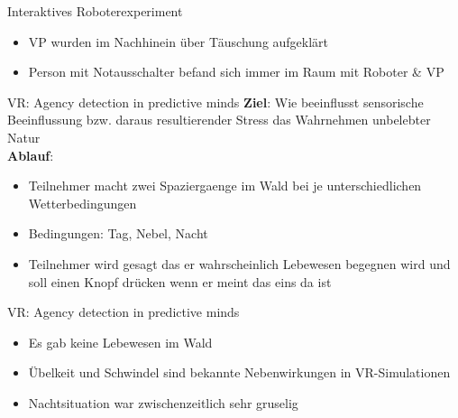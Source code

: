 \documentclass[10pt]{beamer}
\begin{document}
	\begin{frame}{Interaktives Roboterexperiment}

		\begin{itemize}
			\item VP wurden im Nachhinein über Täuschung aufgeklärt
			\item Person mit Notausschalter befand sich immer im Raum mit Roboter \& VP
		\end{itemize}
	\end{frame}
	
	\begin{frame}{VR: Agency detection in predictive minds}
		\textbf{Ziel}: Wie beeinflusst sensorische Beeinflussung bzw. daraus resultierender Stress das Wahrnehmen unbelebter Natur \\
		\textbf{Ablauf}:
		\begin{itemize}
		\item Teilnehmer macht zwei Spaziergaenge im Wald bei je unterschiedlichen Wetterbedingungen
		\item Bedingungen: Tag, Nebel, Nacht
		\item Teilnehmer wird gesagt das er wahrscheinlich Lebewesen begegnen wird und soll einen Knopf drücken wenn er meint das eins da ist
		\end{itemize}
	\end{frame}
	
	
	\begin{frame}{VR: Agency detection in predictive minds}
		
		\begin{itemize}
			\item Es gab keine Lebewesen im Wald
			\item Übelkeit und Schwindel sind bekannte Nebenwirkungen in VR-Simulationen
			\item Nachtsituation war zwischenzeitlich sehr gruselig
		\end{itemize}
		
	\end{frame}
\end{document}
